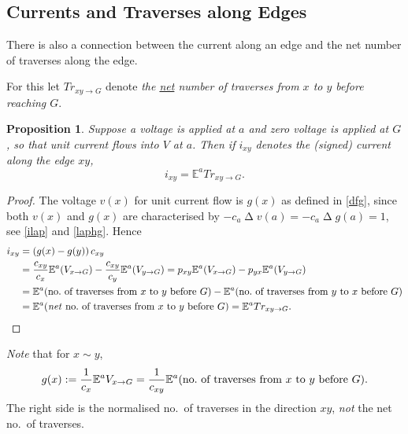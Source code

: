 \documentclass[a4paper]{amsart}
\theoremstyle{plain}
\newtheorem{proposition}[theorem]{Proposition}
\theoremstyle{definition}
\theoremstyle{remark}
\DeclareMathOperator{\lap}{\Delta}
\begin{document}
\subsection{Currents and Traverses along Edges} There is also a connection between the current  along an edge and the net number of traverses along the edge.

For this let $ Tr_{xy\to G } $ denote \emph{the \underline{net} number of traverses from $ x  $ to $ y $ before reaching   $G $}.

\begin{proposition} Suppose a voltage is applied at $ a $ and zero voltage is applied at $ G  $, so that \emph{unit} current flows into $ V $  at $ a $.  Then if $ i_{xy} $ denotes the (signed) current along the edge $ xy $,
\begin{equation} \label{}
\boxed{ i_{xy}  = \mathbb{E}^a Tr_{xy\to G} . }
\end{equation} 
\end{proposition} 

\begin{proof}
The voltage $ v(x) $ for unit current flow   is $ g(x) $ as defined in \eqref{dfg}, since both $ v(x) $ and $ g(x) $ are characterised by $ -c_a \lap v(a) = -c_a\lap g(a) = 1 $,
see \eqref{ilap} and  \eqref{laphg}.
Hence
\begin{align*}
i_{xy} &= (g(x)-g(y) )\, c_{xy}  \\
  & = \frac{c_{xy}}{c_x} \mathbb{E}^a(V_{x\to G}) 
     -  \frac{c_{xy}}{c_y} \mathbb{E}^a(V_{y\to G}) 
  =p_{xy}\mathbb{E}^a(V_{x\to G}) 
     -  p_{yx}\mathbb{E}^a(V_{y\to G}) \\
     &=  \mathbb{E}^a(\text{no.\ of traverses from  $ x $ to $ y $ before $ G $})  - 
     \mathbb{E}^a(\text{no.\ of traverses from  $ y $ to $ x $ before $ G $}) \\
     &=  \mathbb{E}^a(\text{\emph{net} no.\ of traverses from  $ x $ to $ y $ before $ G $})
     = \mathbb{E}^a Tr_{xy\to G} . \qedhere
     \end{align*} 
\end{proof}

\emph{Note} that for $ x\sim y $,
\begin{equation} \label{}
g(x)  := \frac{1}{c_x} \mathbb{E}^a  V_{x\to G} = \frac{1}{c_{xy}} \mathbb{E}^a (\text{no.\ of traverses from  $ x $ to $ y $ before $ G $}).
\end{equation} 
The right side is the normalised no.\ of traverses in the direction   $ xy $, \emph{not} the net no.\  of traverses. 
\end{document}

